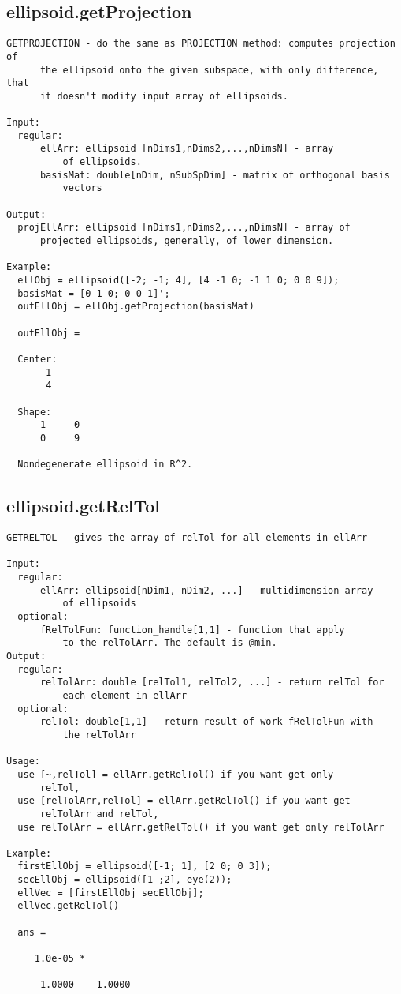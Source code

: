 \subsection{\texorpdfstring{ellipsoid.getProjection}{getProjection}}\label{method:ellipsoid.getProjection}
\begin{verbatim}
GETPROJECTION - do the same as PROJECTION method: computes projection of
      the ellipsoid onto the given subspace, with only difference, that
      it doesn't modify input array of ellipsoids.

Input:
  regular:
      ellArr: ellipsoid [nDims1,nDims2,...,nDimsN] - array
          of ellipsoids.
      basisMat: double[nDim, nSubSpDim] - matrix of orthogonal basis
          vectors

Output:
  projEllArr: ellipsoid [nDims1,nDims2,...,nDimsN] - array of
      projected ellipsoids, generally, of lower dimension.

Example:
  ellObj = ellipsoid([-2; -1; 4], [4 -1 0; -1 1 0; 0 0 9]);
  basisMat = [0 1 0; 0 0 1]';
  outEllObj = ellObj.getProjection(basisMat)

  outEllObj =

  Center:
      -1
       4

  Shape:
      1     0
      0     9

  Nondegenerate ellipsoid in R^2.
\end{verbatim}
\subsection{\texorpdfstring{ellipsoid.getRelTol}{getRelTol}}\label{method:ellipsoid.getRelTol}
\begin{verbatim}
GETRELTOL - gives the array of relTol for all elements in ellArr

Input:
  regular:
      ellArr: ellipsoid[nDim1, nDim2, ...] - multidimension array
          of ellipsoids
  optional:
      fRelTolFun: function_handle[1,1] - function that apply
          to the relTolArr. The default is @min.
Output:
  regular:
      relTolArr: double [relTol1, relTol2, ...] - return relTol for
          each element in ellArr
  optional:
      relTol: double[1,1] - return result of work fRelTolFun with
          the relTolArr

Usage:
  use [~,relTol] = ellArr.getRelTol() if you want get only
      relTol,
  use [relTolArr,relTol] = ellArr.getRelTol() if you want get
      relTolArr and relTol,
  use relTolArr = ellArr.getRelTol() if you want get only relTolArr

Example:
  firstEllObj = ellipsoid([-1; 1], [2 0; 0 3]);
  secEllObj = ellipsoid([1 ;2], eye(2));
  ellVec = [firstEllObj secEllObj];
  ellVec.getRelTol()

  ans =

     1.0e-05 *

      1.0000    1.0000
\end{verbatim}
